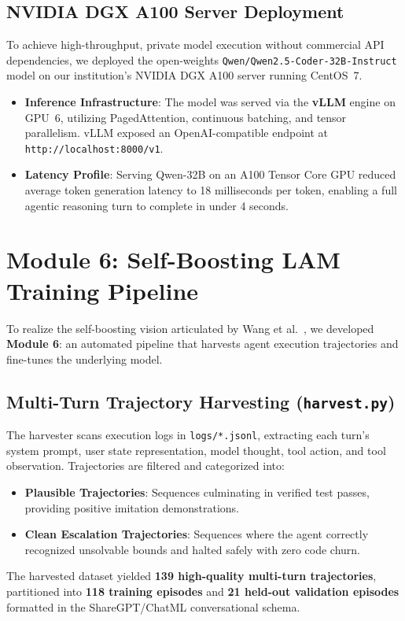 \documentclass[12pt,a4paper]{report}
\begin{document}
\subsection{NVIDIA DGX A100 Server Deployment}
To achieve high-throughput, private model execution without commercial API dependencies, we deployed the open-weights \texttt{Qwen/Qwen2.5-Coder-32B-Instruct} model on our institution's NVIDIA DGX A100 server running CentOS~7.
\begin{itemize}
    \item \textbf{Inference Infrastructure}: The model was served via the \textbf{vLLM} engine on GPU~6, utilizing PagedAttention, continuous batching, and tensor parallelism. vLLM exposed an OpenAI-compatible endpoint at \texttt{http://localhost:8000/v1}.
    \item \textbf{Latency Profile}: Serving Qwen-32B on an A100 Tensor Core GPU reduced average token generation latency to 18 milliseconds per token, enabling a full agentic reasoning turn to complete in under 4 seconds.
\end{itemize}

\section{Module 6: Self-Boosting LAM Training Pipeline}
To realize the self-boosting vision articulated by Wang et al.~\cite{wang2024large}, we developed \textbf{Module 6}: an automated pipeline that harvests agent execution trajectories and fine-tunes the underlying model.

\subsection{Multi-Turn Trajectory Harvesting (\texttt{harvest.py})}
The harvester scans execution logs in \texttt{logs/*.jsonl}, extracting each turn's system prompt, user state representation, model thought, tool action, and tool observation. Trajectories are filtered and categorized into:
\begin{itemize}
    \item \textbf{Plausible Trajectories}: Sequences culminating in verified test passes, providing positive imitation demonstrations.
    \item \textbf{Clean Escalation Trajectories}: Sequences where the agent correctly recognized unsolvable bounds and halted safely with zero code churn.
\end{itemize}
The harvested dataset yielded \textbf{139 high-quality multi-turn trajectories}, partitioned into \textbf{118 training episodes} and \textbf{21 held-out validation episodes} formatted in the ShareGPT/ChatML conversational schema.
\end{document}
